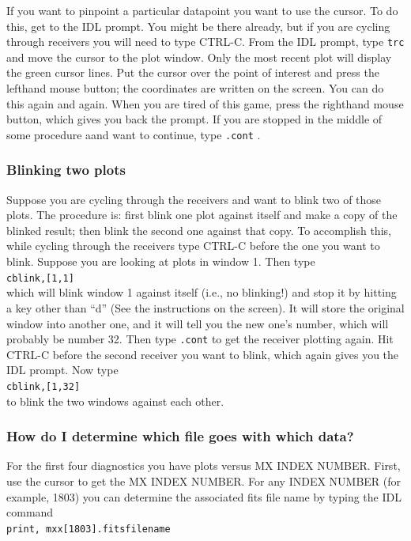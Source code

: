 \documentclass[psfig,preprint]{aastex}
\begin{document}
	If you want to pinpoint a particular datapoint you want to use
the cursor.  To do this, get to the IDL prompt.  You might be there
already, but if you are cycling through receivers you will need to type
CTRL-C.  From the IDL prompt, type \verb$trc$ and move the cursor to the
plot window.  Only the most recent plot will display the green cursor
lines.  Put the cursor over the point of interest and press the lefthand
mouse button; the coordinates are written on the screen.  You can do
this again and again.  When you are tired of this game, press the
righthand mouse button, which gives you back the prompt. If you are
stopped in the middle of some procedure aand want to continue, type
\verb$.cont$ . 

\subsubsection{Blinking two plots}

	Suppose you are cycling through the receivers and want to blink
two of those plots. The procedure is: first blink one plot against
itself and make a copy of the blinked result; then blink the second one
against that copy. To accomplish this, while cycling through the
receivers type CTRL-C before the one you want to blink. Suppose you are
looking at plots in window 1. Then type \\
\verb$cblink,[1,1]$ \\
which will blink window 1 against itself (i.e., no blinking!) and stop it by
hitting a key other than ``d'' (See the instructions on the screen). 
It will store the original window into
another one, and it will tell you the new one's number, which will
probably be number 32. Then type \verb$.cont$ to get the
receiver plotting again. Hit CTRL-C before the second receiver you want
to blink, which again gives you the IDL prompt. Now type \\
\verb$cblink,[1,32]$ \\
to blink the two windows against each other.

\subsubsection{How do I determine which file goes with which data?}

	For the first four diagnostics you have plots versus MX INDEX
NUMBER.  First, use the cursor to get the MX INDEX NUMBER.  For any
INDEX NUMBER (for example, 1803) you can determine the associated fits
file name by typing the IDL command \\ 
\verb$print, mxx[1803].fitsfilename$
\end{document}
